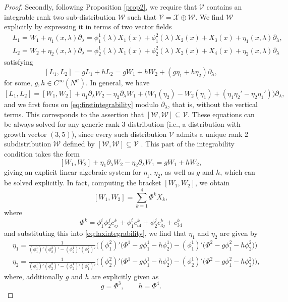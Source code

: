 \documentclass[11pt]{amsart}
\theoremstyle{definition}
\newcommand{\VV}{\mathcal{V}}
\newcommand{\WW}{\mathcal{W}}
\newcommand{\XX}{\mathcal{X}}
\newcommand{\CC}{\mathcal{C}}
\begin{document}
\begin{proof}
Secondly, following Proposition \ref{prop2}, we require that $\VV$ contains an integrable rank two sub-distribution $\WW$ such that $\VV=\XX\oplus\WW$. We find $\WW$ explicitly by expressing it in terms of two vector fields 
\[
\begin{aligned}
&L_1=W_1+\eta_1(x,\lambda)\partial_\lambda=\phi^1_1(\lambda)X_1(x)+\phi^2_1(\lambda)X_2(x)+X_3(x)+\eta_1(x,\lambda)\partial_\lambda,\\
&L_2=W_2+\eta_2(x,\lambda)\partial_\lambda=\phi^1_2(\lambda)X_1(x)+\phi^2_2(\lambda)X_2(x)+X_4(x)+\eta_2(x,\lambda)\partial_\lambda
\end{aligned}
\]
satisfying
\begin{equation}\label{eq:firstintegrability}
[L_1,L_2]=gL_1+hL_2=gW_1+hW_2+(g\eta_1+h\eta_2)\partial_\lambda,
\end{equation}
for some, $g,h\in C^\infty(N^\CC)$.
In general, we have
\[
[L_1,L_2]=[W_1,W_2]+\eta_1\partial_\lambda W_2-\eta_2\partial_\lambda W_1+\big(W_1(\eta_2)-W_2(\eta_1)+(\eta_1\eta_2'-\eta_2\eta_1')\big)\partial_\lambda,
\]
and we first focus on \eqref{eq:firstintegrability} modulo $\partial_\lambda$, that is, without the vertical terms. This corresponds to the assertion that $[\WW,\WW]\subseteq \VV$. These equations can be always solved for any generic rank 3 distribution (i.e., a distribution with growth vector $(3,5)$), since every such distribution $\VV$ admits a unique rank 2 subdistribution $\WW$ defined by $[\WW,\WW]\subseteq \VV$ \cite[Lemma 6.12]{Mon}. This part of the integrability condition takes the form
\begin{equation}\label{eq:laxintegrability}
[W_1,W_2]+\eta_1\partial_\lambda W_2-\eta_2\partial_\lambda W_1
= g W_1 + h W_2,
\end{equation}
giving an explicit linear algebraic system for $\eta_1$, $\eta_2$, as well as $g$ and $h$, which can be solved explicitly. In fact, computing the bracket $[W_1,W_2]$, we obtain
\[
[W_1,W_2]=\sum_{k=1}^4\Phi^k X_k,
\]
where
\[
\Phi^k=\phi_1^i \phi_2^j c^k_{ij}+\phi_1^i c^k_{i4}+\phi_2^j c^k_{3j}+ c^k_{34}
\]
and substituting this into \eqref{eq:laxintegrability}, we find that $\eta_1$ and $\eta_2$ are given by
\[
\begin{aligned}
&\eta_1=\tfrac{1}{(\phi^1_1)'(\phi^2_2)'-(\phi^1_2)'(\phi^2_1)'}\big( 
(\phi^2_1)'\big(\Phi^1-g\phi^1_1-h\phi^1_2\big)
-(\phi^1_1)'\big(\Phi^2-g\phi^2_1-h\phi^2_2\big)
\big)\\
&\eta_2=\tfrac{1}{(\phi^1_1)'(\phi^2_2)'-(\phi^1_2)'(\phi^2_1)'}\big(
(\phi^2_2)'\big(\Phi^1-g\phi^1_1-h\phi^1_2\big)
-(\phi^1_2)'\big(\Phi^2-g\phi^2_1-h\phi^2_2\big)
\big),
\end{aligned}
\]
where, additionally $g$ and $h$ are explicitly given as
\[
g=\Phi^3,\qquad h=\Phi^4.
\]


\end{proof}
\end{document}
